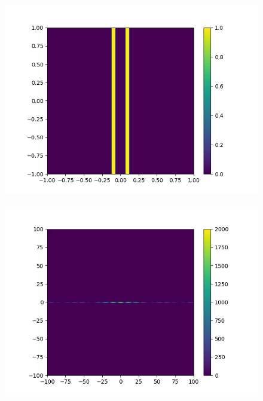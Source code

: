 \begin{figure}[htbp]
	\begin{minipage}[ht]{0.48\hsize}\centering
		\includegraphics[width=\linewidth]{src/figures/result/ds1_original_estimation.png}
		\label{subfig:amplitude_sim_dual1_original}
	\end{minipage}
	\begin{minipage}[ht]{0.48\hsize}\centering
		\includegraphics[width=\linewidth]{src/figures/result/ds1_amplitude_estimation.png}
		\label{subfig:amplitude_sim_dual1}
	\end{minipage}
	\begin{minipage}[ht]{0.48\hsize}\centering

\end{minipage}
\end{figure}
